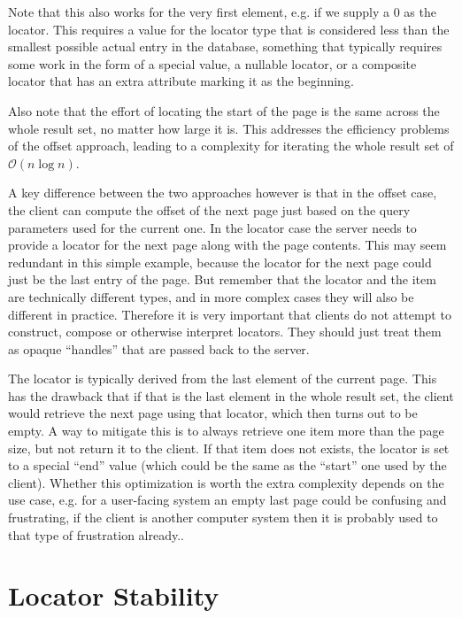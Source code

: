 \documentclass[11pt,a4paper]{article}
\begin{document}
\begin{multicols*}{2}
Note that this also works for the very first element, e.g. if we supply a 0 as
the locator. This requires a value for the locator type that is considered less
than the smallest possible actual entry in the database, something that
typically requires some work in the form of a special value, a nullable locator,
or a composite locator that has an extra attribute marking it as the beginning.

Also note that the effort of locating the start of the page is the same across
the whole result set, no matter how large it is. This addresses the efficiency
problems of the offset approach, leading to a complexity for iterating the whole
result set of $\mathcal{O}(n\log{}n)$.

A key difference between the two approaches however is that in the offset case,
the client can compute the offset of the next page just based on the query
parameters used for the current one. In the locator case the server needs to
provide a locator for the next page along with the page contents. This may seem
redundant in this simple example, because the locator for the next page could
just be the last entry of the page. But remember that the locator and the item 
are technically different types, and in more complex cases they will also be
different in practice. Therefore it is very important that clients do not
attempt to construct, compose or otherwise interpret locators. They should just
treat them as opaque ``handles'' that are passed back to the server.

The locator is typically derived from the last element of the current page. 
This has the drawback that if that is the last element in the whole result set,
the client would retrieve the next page using that locator, which then turns out to be empty. A way to
mitigate this is to always retrieve one item more than the page size, but not
return it to the client. If that item does not exists, the locator is set to a
special ``end'' value (which could be the same as the ``start'' one used by the
client). Whether this optimization is worth the extra complexity depends on the
use case, e.g. for a user-facing system an empty last page could be confusing
and frustrating, if the client is another computer system then it is probably
used to that type of frustration already..

\section*{Locator Stability}


\end{multicols*}
\end{document}
